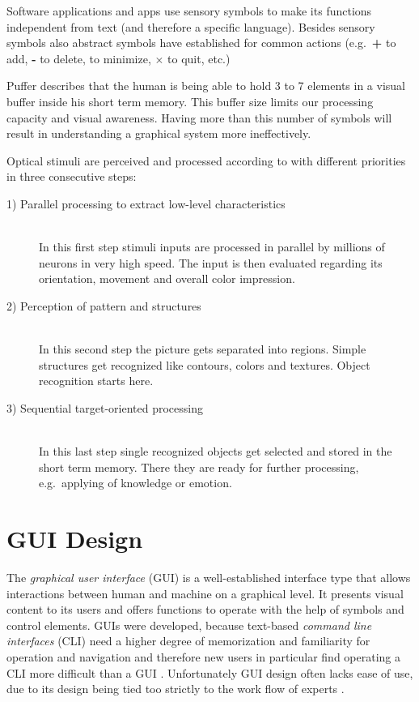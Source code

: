 \documentclass[twoside, openright, 12pt]{book}
\begin{document}
Software applications and apps use sensory symbols to make its functions independent from text (and therefore a specific language).
Besides sensory symbols also abstract symbols have established for common actions (e.g.~\textbf{+} to add, \textbf{-} to delete, \textbf{ \underline{ }} to minimize, \textbf{$\times$} to quit, etc.)

Puffer
\cite{Zeckzer14a} describes that the human is being able to hold 3 to 7 elements in a visual buffer inside his short term memory.
This buffer size limits our processing capacity and visual awareness.
Having more than this number of symbols will result in understanding a graphical system more ineffectively.

Optical stimuli are perceived and processed according to \cite{Ware04a} with different priorities in three consecutive steps:

\begin{description}
\item[1) Parallel processing to extract low-level characteristics]\hfill \\
In this first step stimuli inputs are processed in parallel by millions of neurons in very high speed.
The input is then evaluated regarding its orientation, movement and overall color impression.

\item[2) Perception of pattern and structures]\hfill \\
In this second step the picture gets separated into regions.
Simple structures get recognized like contours, colors and textures.
Object recognition starts here.

\item[3) Sequential target-oriented processing]\hfill \\
In this last step single recognized objects get selected and stored in the short term memory.
There they are ready for further processing, e.g.~applying of knowledge or emotion.
\end{description}



\section{GUI Design}
\label{gui_design}
The \textit{graphical user interface} (GUI) is a well-established interface type that allows interactions between human and machine on a graphical level.
It presents visual content to its users and offers functions to operate with the help of symbols and control elements.
GUIs were developed, because text-based \textit{command line interfaces} (CLI) need a higher degree of memorization and familiarity for operation and navigation and therefore new users in particular find operating a CLI more difficult than a GUI \citep{CLI}.
Unfortunately GUI design often lacks ease of use, due to its design being tied too strictly to the work flow of experts \citep{Reckling14}.
\end{document}
